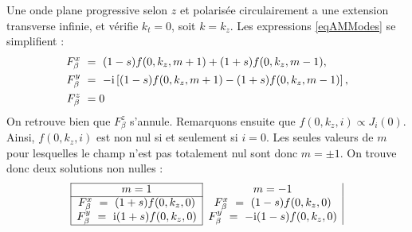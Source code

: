 Une onde plane progressive selon $z$ et polarisée circulairement a une extension transverse infinie, et vérifie $k_t = 0$, soit $k = k_z$. Les expressions \ref{eqAMModes} se simplifient :
\begin{equation}
\begin{aligned}
F_{\beta}^x ~&= ~(1-s)f(0,k_z,m+1)+(1+s)f(0,k_z,m-1),\\
F_{\beta}^y ~&= ~-\mathrm{i}\left[(1-s)f(0,k_z,m+1)-(1+s)f(0,k_z,m-1)\right],\\
F_{\beta}^z ~&= 0
\end{aligned}
\end{equation}
On retrouve bien que $F_{\beta}^z$ s'annule. Remarquons ensuite que $f(0,k_z,i) \propto J_i(0)$. Ainsi, $f(0,k_z,i)$ est non nul si et seulement si $i = 0$. Les seules valeurs de $m$ pour lesquelles le champ n'est pas totalement nul sont donc $m=\pm 1$. On trouve donc deux solutions non nulles :
\[
\begin{array}{|c|c|}
	\hline
	m = 1 &m = -1 \\
	\hline
	F_{\beta}^x ~= ~(1+s)f(0,k_z,0) & F_{\beta}^x ~= ~(1-s)f(0,k_z,0)\\
		F_{\beta}^y ~= ~\rmi(1+s)f(0,k_z,0) & F_{\beta}^y ~= ~-\rmi(1-s)f(0,k_z,0)\\
		\hline
\end{array}\]

